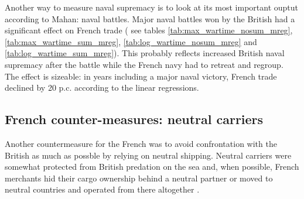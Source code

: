 \documentclass[12pt,a4paper,notitlepage,english]{article}
\begin{document}
 Another way to measure naval supremacy is to look at its most important ouptut according to Mahan: naval battles.
 Major naval battles won by the British had a significant effect on French trade ( see tables \ref{tab:max_wartime_nosum_mreg},  \ref{tab:max_wartime_sum_mreg}, \ref{tab:log_wartime_nosum_mreg} and   \ref{tab:log_wartime_sum_mreg}).
 This probably reflects increased British naval supremacy after the battle while the French navy had to retreat and regroup.
 The effect is sizeable: in years including a major naval victory, French trade declined by 20 p.c. according to the linear regressions.
 
 

 \subsection{French counter-measures: neutral carriers}

 Another countermeasure for the French was to avoid confrontation with the British as much as possble by relying on neutral shipping.
 Neutral carriers were somewhat protected from British predation on the sea and, when possible, French merchants hid their cargo ownership behind a neutral partner or moved to neutral countries and operated from there altogether \citep{Marzagalli2016}.
 
\end{document}
